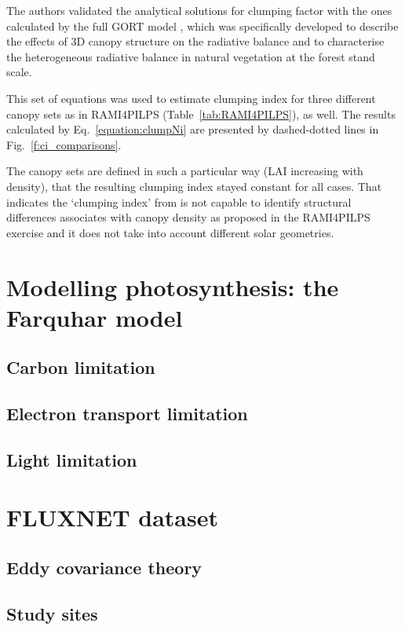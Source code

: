 \documentclass[a4paper,11pt]{report}
\begin{document}
The authors validated the analytical solutions for clumping factor with the ones calculated by the full GORT model \citep{Li1995}, which was specifically developed to describe the effects of 3D canopy structure on the radiative balance and to characterise the heterogeneous radiative balance in natural vegetation at the forest stand scale. 

This set of equations was used to estimate clumping index for three different canopy sets as in RAMI4PILPS (Table~\ref{tab:RAMI4PILPS}), as well. The results calculated by Eq.~\ref{equation:clumpNi} are presented by dashed-dotted lines in Fig.~\ref{f:ci_comparisons}. 

The canopy sets are defined in such a particular way (LAI increasing with density), that the resulting clumping index stayed constant for all cases. That indicates the `clumping index' from \citet{Ni-Meister2010} is not capable to identify structural differences associates with canopy density as proposed in the RAMI4PILPS exercise and it does not take into account different solar geometries.

\section{Modelling photosynthesis: the Farquhar model}

\subsection{Carbon limitation}

\subsection{Electron transport limitation}

\subsection{Light limitation}

\section{FLUXNET dataset}

\subsection{Eddy covariance theory}

\subsection{Study sites}
\end{document}
